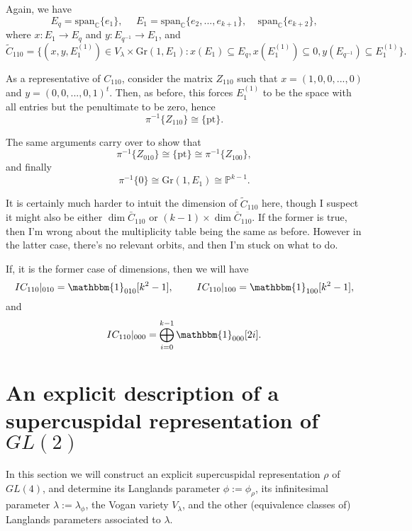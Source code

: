 \documentclass{memoir}
\newcommand{\mb}{\mathbb}
\newcommand{\bc}{\mathbb{C}}
\newcommand{\tx}{\text}
\theoremstyle{definition}
\begin{document}
	Again, we have 
	$$E_q=\tx{span}_{\bc}\{e_1\}, \ \ \ \ \ \ E_1=\tx{span}_{\bc}\{e_2, ..., e_{k+1}\}, \ \ \ \ \ \tx{span}_{\bc}\{e_{k+2}\},$$
	where $x:E_1\to E_q$ and $y:E_{q^{-1}}\to E_1$, and 
	$$\tilde{C}_{110}=\{(x, y, E_1^{(1)})\in V_\lambda\times\tx{Gr}(1, E_1) : x(E_1)\subseteq E_q, x(E_1^{(1)})\subseteq 0, y(E_{q^{-1}})\subseteq E_1^{(1)}\}.$$
	
	As a representative of $C_{110}$, consider the matrix $Z_{110}$ such that 
	$x=(1, 0, 0, ..., 0)$ and $y=(0, 0, ..., 0, 1)^t$.  
	Then, as before, this forces $E_1^{(1)}$ to be the space with all entries but the penultimate to be zero, hence
	$$\pi^{-1}\{Z_{110}\}\cong\{\tx{pt}\}.$$
	
	The same arguments carry over to show that 
	$$\pi^{-1}\{Z_{010}\}\cong\{\tx{pt}\}\cong\pi^{-1}\{Z_{100}\},$$
	and finally 
	$$\pi^{-1}\{0\}\cong \tx{Gr}(1, E_1)\cong \mb{P}^{k-1}.$$
	
	It is certainly much harder to intuit the dimension of $\tilde{C}_{110}$ here, though I suspect it might also be either $\dim\bar{C}_{110}$ or $(k-1)\times\dim\bar{C}_{110}$.  
	If the former is true, then I'm wrong about the multiplicity table being the same as before.  
	However in the latter case, there's no relevant orbits, and then I'm stuck on what to do. 
	
	If, it is the former case of dimensions, then we will have 
	$$IC_{110}|_{010}=\mathbbm{1}_{010}[k^2-1], \ \ \ \ \ \ \ IC_{110}|_{100}=\mathbbm{1}_{100}[k^2-1],$$
	and 
	$$IC_{110}|_{000}=\bigoplus_{i=0}^{k-1}\mathbbm{1}_{000}[2i].$$


	
	\section{An explicit description of a supercuspidal representation of $GL(2)$}
	
	In this section we will construct an explicit supercuspidal representation $\rho$ of $GL(4)$, and determine its Langlands parameter $\phi:=\phi_\rho$, its infinitesimal parameter $\lambda:=\lambda_\phi$, the Vogan variety $V_\lambda$, and the other (equivalence classes of) Langlands parameters associated to $\lambda$.  
	
\end{document}
